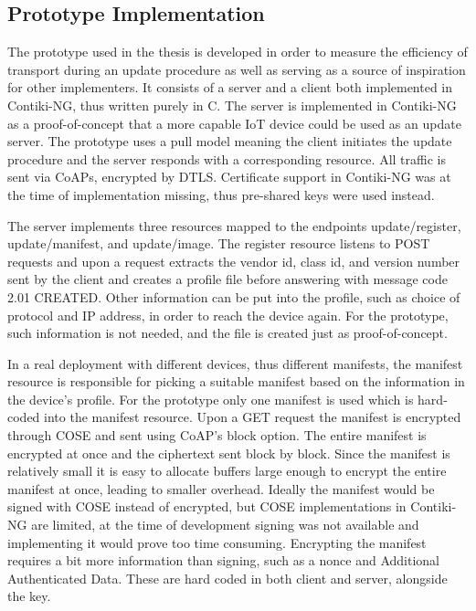 \documentclass[0-thesis.tex]{subfiles}
\begin{document}
\subsection{Prototype Implementation}
\label{ssec:prototype-implementation}
The prototype used in the thesis is developed in order to measure the efficiency of
transport during an update procedure as well as serving as a source of inspiration for
other implementers. It consists of a server and a client both implemented in Contiki-NG,
thus written purely in C. The server is implemented in Contiki-NG as a proof-of-concept
that a more capable IoT device could be used as an update server. The prototype uses a
pull model meaning the client initiates the update procedure and the server responds with
a corresponding resource. All traffic is sent via CoAPs, encrypted by DTLS. Certificate
support in Contiki-NG was at the time of implementation missing, thus pre-shared keys were
used instead.

The server implements three resources mapped to the endpoints update/register,
update/manifest, and update/image. The register resource listens to POST requests and upon
a request extracts the vendor id, class id, and version number sent by the client and
creates a profile file before answering with message code 2.01 CREATED. Other information
can be put into the profile, such as choice of protocol and IP address, in order to reach
the device again. For the prototype, such information is not needed, and the file is
created just as proof-of-concept.

In a real deployment with different devices, thus different manifests, the manifest
resource is responsible for picking a suitable manifest based on the information in the
device's profile. For the prototype only one manifest is used which is hard-coded into the
manifest resource. Upon a GET request the manifest is encrypted through COSE and sent
using CoAP's block option. The entire manifest is encrypted at once and the ciphertext
sent block by block. Since the manifest is relatively small it is easy to allocate buffers
large enough to encrypt the entire manifest at once, leading to smaller overhead. Ideally
the manifest would be signed with COSE instead of encrypted, but COSE implementations in
Contiki-NG are limited, at the time of development signing was not available and
implementing it would prove too time consuming. Encrypting the manifest requires a bit
more information than signing, such as a nonce and Additional Authenticated Data. These
are hard coded in both client and server, alongside the key.
\end{document}
